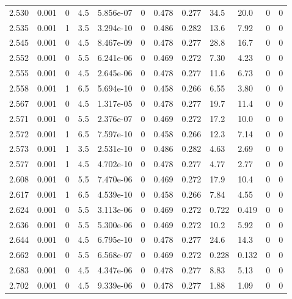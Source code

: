 \documentclass[preview]{standalone}
\begin{document}
{{{{{\begin{tabular}{L{1.2cm}C{1.2cm} C{0.3cm}C{0.5cm} C{1.4cm}C{1.4cm} C{1.4cm}C{1.4cm} C{1.6cm}C{1.6cm} C{1.6cm}C{1.6cm}}
  2.530  &  0.001  & 0     & 4.5 &  5.856e-07  & 0  &  0.478&   0.277& 34.5 & 20.0   &  0 & 0  \\ 
  2.535  &  0.001  & 1     & 3.5 &  3.294e-10  & 0  &  0.486&   0.282& 13.6 & 7.92   &  0 & 0  \\ 
  2.545  &  0.001  & 0     & 4.5 &  8.467e-09  & 0  &  0.478&   0.277& 28.8 & 16.7   &  0 & 0  \\ 
  2.552  &  0.001  & 0     & 5.5 &  6.241e-06  & 0  &  0.469&   0.272& 7.30 & 4.23   &  0 & 0  \\ 
  2.555  &  0.001  & 0     & 4.5 &  2.645e-06  & 0  &  0.478&   0.277& 11.6 & 6.73   &  0 & 0  \\ 
  2.558  &  0.001  & 1     & 6.5 &  5.694e-10  & 0  &  0.458&   0.266& 6.55 & 3.80   &  0 & 0  \\ 
  2.567  &  0.001  & 0     & 4.5 &  1.317e-05  & 0  &  0.478&   0.277& 19.7 & 11.4   &  0 & 0  \\ 
  2.571  &  0.001  & 0     & 5.5 &  2.376e-07  & 0  &  0.469&   0.272& 17.2 & 10.0   &  0 & 0  \\ 
  2.572  &  0.001  & 1     & 6.5 &  7.597e-10  & 0  &  0.458&   0.266& 12.3 & 7.14   &  0 & 0  \\ 
  2.573  &  0.001  & 1     & 3.5 &  2.531e-10  & 0  &  0.486&   0.282& 4.63 & 2.69   &  0 & 0  \\ 
  2.577  &  0.001  & 1     & 4.5 &  4.702e-10  & 0  &  0.478&   0.277& 4.77 & 2.77   &  0 & 0  \\ 
  2.608  &  0.001  & 0     & 5.5 &  7.470e-06  & 0  &  0.469&   0.272& 17.9 & 10.4   &  0 & 0  \\ 
  2.617  &  0.001  & 1     & 6.5 &  4.539e-10  & 0  &  0.458&   0.266& 7.84 & 4.55   &  0 & 0  \\ 
  2.624  &  0.001  & 0     & 5.5 &  3.113e-06  & 0  &  0.469&   0.272& 0.722 & 0.419   &  0 & 0  \\ 
  2.636  &  0.001  & 0     & 5.5 &  5.300e-06  & 0  &  0.469&   0.272& 10.2 & 5.92   &  0 & 0  \\ 
  2.644  &  0.001  & 0     & 4.5 &  6.795e-10  & 0  &  0.478&   0.277& 24.6 & 14.3   &  0 & 0  \\ 
  2.662  &  0.001  & 0     & 5.5 &  6.568e-07  & 0  &  0.469&   0.272& 0.228 & 0.132   &  0 & 0  \\ 
  2.683  &  0.001  & 0     & 4.5 &  4.347e-06  & 0  &  0.478&   0.277& 8.83 & 5.13   &  0 & 0  \\ 
  2.702  &  0.001  & 0     & 4.5 &  9.339e-06  & 0  &  0.478&   0.277& 1.88 & 1.09   &  0 & 0  \\ 

\end{tabular}}}}}}
\end{document}
